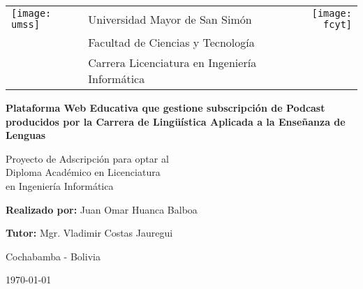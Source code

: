 
\begin{titlepage}
	
	\begin{tabular}[t]{l p{9cm} r}

		\texttt{[image: umss]}	& \centering \large{Universidad Mayor de San Sim\'{o}n} &	\texttt{[image: fcyt]} 	\\
		 									& \centering \large{Facultad de Ciencias y Tecnolog\'{i}a} &	\\
											& \centering \large{Carrera Licenciatura en Ingenier\'{i}a Inform\'{a}tica} &	\\
	\end{tabular}
	
	
	\begin{center}
		\normalsize
		
		\vspace{1.5cm}
		\Large{
		\textbf{Plataforma Web Educativa que gestione subscripci\'{o}n de Podcast producidos por la Carrera de Ling\"{u}\'{i}stica Aplicada a la Ense\~{n}anza de Lenguas} 
		}		\\
	
		\vspace{1.5cm}
	
		\small
	\end{center}
		
	\begin{flushright}
	
		Proyecto de Adscripci\'{o}n para optar al \\ 
		Diploma Acad\'{e}mico en Licenciatura \\ 
		en Ingenier\'{i}a Inform\'{a}tica	
		
	\end{flushright}
	
	\begin{center}
		
		\vspace{1.5cm}
			
		\textbf{Realizado por:} Juan Omar Huanca Balboa \\
	
		\vspace{1.5cm}
	
		\textbf{Tutor:} Mgr. Vladimir Costas Jauregui \\
		
		\vspace{1.5cm}
		
		Cochabamba - Bolivia
	
		\vspace{1.5cm}
					
		\monthYear\today
		
	\end{center}			

\end{titlepage}